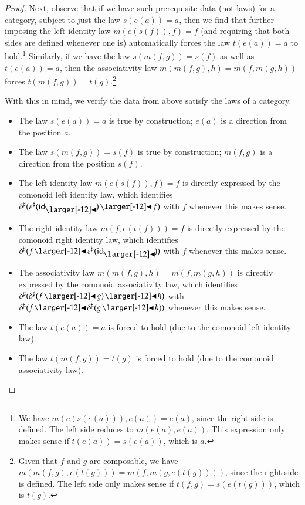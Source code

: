 \documentclass{amsart}
\begin{document}
\begin{proof}
  Next, observe that if we have such prerequisite data (not laws) for
  a category, subject to just the law $s(e(a)) = a$, then we find that
  further imposing the left identity law $m(e(s(f)), f) = f$
  (and requiring that both sides are defined whenever one is)
  automatically forces the law $t(e(a)) = a$ to hold.\footnote{We have
    $m(e(s(e(a))), e(a)) = e(a)$, since the right side is defined. The
    left side reduces to $m(e(a), e(a))$. This expression only makes
    sense if $t(e(a)) = s(e(a))$, which is $a$.}  Similarly, if we
  have the law $s(m(f,g))=s(f)$ as well as $t(e(a)) = a$, then the
  associativity law $m(m(f,g),h) = m(f,m(g,h))$ forces
  $t(m(f,g)) = t(g)$.\footnote{Given that $f$ and $g$ are composable,
    we have $m(m(f,g),e(t(g))) = m(f,m(g,e(t(g))))$, since the right
    side is defined. The left side only makes sense if
    $t(f,g) = s(e(t(g)))$, which is $t(g)$.}

  With this in mind, we verify the data from above satisfy the laws of
  a category.
  \begin{itemize}
  \item The law $s(e(a)) = a$ is true by construction; $e(a)$ is a
    direction from the position $a$.
  \item The law $s(m(f, g)) = s(f)$ is true by construction; $m(f, g)$
    is a direction from the position $s(f)$.
  \item The left identity law $m(e(s(f)), f) = f$ is directly
    expressed by the comonoid left identity law, which identifies
    ${\anydirmapof{\delta}{\anydirmapof{\varepsilon}{\idsubd} \subd f}}$
    with $f$ whenever this makes sense.\iffalse\footnote{Meaning,
        there are $u$ and $v$ such that
        ${\dirmapof{\delta}{u}{\dirmapof{\varepsilon}{v}{\idsubd} \subd
            f}}$ specifies a direction from position $a$ $\iff$ $f$
        specifies a direction from position $a$; in this case, the
        former and latter are equal.}\fi
  \item The right identity law $m(f, e(t(f))) = f$ is directly
    expressed by the comonoid right identity law, which identifies
    ${\anydirmapof{\delta}{f \subd \anydirmapof{\varepsilon}{\idsubd}}}$
    with $f$ whenever this makes sense.
  \item The associativity law $m(m(f, g), h) = m(f, m(g, h))$ is
    directly expressed by the comonoid associativity law, which
    identifies
    ${\anydirmapof{\delta}{\anydirmapof{\delta}{f \subd g} \subd h}}$ with
    ${\anydirmapof{\delta}{f \subd \anydirmapof{\delta}{g \subd h}}}$ whenever this makes sense.
  \item The law $t(e(a)) = a$ is forced to hold (due to the comonoid
    left identity law).
  \item The law $t(m(f, g)) = t(g)$ is forced to hold (due to the
    comonoid associativity law).
  \end{itemize}


\end{proof}
\end{document}
